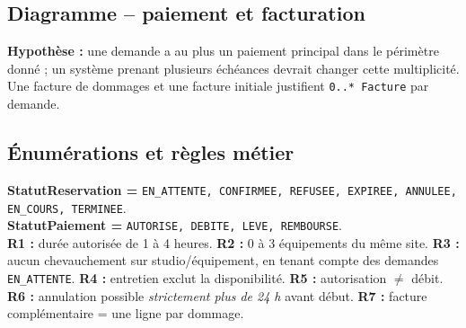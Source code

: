 \documentclass[10pt,a4paper]{article}
\begin{document}
\subsection{Diagramme -- paiement et facturation}
\begin{center}
\end{center}
\textbf{Hypothèse :} une demande a au plus un paiement principal dans le périmètre donné ; un système prenant plusieurs échéances devrait changer cette multiplicité. Une facture de dommages et une facture initiale justifient \texttt{0..* Facture} par demande.

\subsection{Énumérations et règles métier}
\begin{tcolorbox}
\textbf{StatutReservation =} \texttt{EN\_ATTENTE, CONFIRMEE, REFUSEE, EXPIREE, ANNULEE, EN\_COURS, TERMINEE}.\\
\textbf{StatutPaiement =} \texttt{AUTORISE, DEBITE, LEVE, REMBOURSE}.\\
\textbf{R1 :} durée autorisée de 1 à 4 heures. \textbf{R2 :} 0 à 3 équipements du même site. \textbf{R3 :} aucun chevauchement sur studio/équipement, en tenant compte des demandes \texttt{EN\_ATTENTE}. \textbf{R4 :} entretien exclut la disponibilité. \textbf{R5 :} autorisation \(\neq\) débit. \textbf{R6 :} annulation possible \emph{strictement plus de 24 h} avant début. \textbf{R7 :} facture complémentaire = une ligne par dommage.
\end{tcolorbox}
\end{document}
